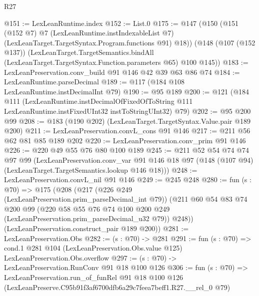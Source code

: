 \begin{lexlean}{R27}
\begin{coremodule}
@151 := LexLeanRuntime.index
@152 := List.{0}
@175 := @147
    (@150
      (@151
        (@152 @7)
        @7
        (LexLeanRuntime.instIndexableList @7)
        (LexLeanTarget.TargetSyntax.Program.functions @91)
        @18))
    (@148
      (@107 (@152 @137))
      (LexLeanTarget.TargetSemantics.bindAll
        (LexLeanTarget.TargetSyntax.Function.parameters @65)
        @100
        @145))
@183 := LexLeanPreservation.conv_build @91 @146 @42 @39 @63 @86 @74
@184 := LexLeanRuntime.parseDecimal
@189 := @117 (@184 @108 LexLeanRuntime.instDecimalInt @79)
@190 := @95 @189
@200 := @121
    (@184
      @111
      (LexLeanRuntime.instDecimalOfFixedOfToString
        @111
        LexLeanRuntime.instFixedUInt32
        instToStringUInt32)
      @79)
@202 := @95 @200 @99
@208 := @183 (@190 @202) (LexLeanTarget.TargetSyntax.Value.pair @189 @200)
@211 := LexLeanPreservation.convL_cons @91 @146
@217 := @211 @56 @62 @81 @85 @189 @202
@220 := LexLeanPreservation.conv_prim @91 @146
@226 := @220 @49 @55 @76 @80 @100 @189
@245 := @211
    @52
    @54
    @74
    @74
    @97
    @99
    (LexLeanPreservation.conv_var
      @91
      @146
      @18
      @97
      (@148 (@107 @94) (LexLeanTarget.TargetSemantics.lookup @146 @18)))
@248 := LexLeanPreservation.convL_nil @91 @146
@249 := @245 @248
@280 := fun (s : @70) =>
  @175
    (@208
      (@217
        (@226 @249 (LexLeanPreservation.prim_parseDecimal_int @79))
        (@211
          @60
          @54
          @83
          @74
          @200
          @99
          (@220 @58 @55 @76 @74 @100 @200 @249 (LexLeanPreservation.prim_parseDecimal_u32 @79))
          @248))
      (LexLeanPreservation.construct_pair @189 @200))
@281 := LexLeanPreservation.Obs
@282 := (s : @70) -> @281
@291 := fun (s : @70) =>
  cond.{1} @281 @104 (LexLeanPreservation.Obs.value @125) LexLeanPreservation.Obs.overflow
@297 := (s : @70) -> LexLeanPreservation.RunConv @91 @18 @100 @126
@306 := fun (s : @70) =>
  LexLeanPreservation.run_of_funRel
    @91
    @18
    @100
    @126
    (LexLeanPreserve.C95b91f3af6700dfb6a29c7feea7beff1.R27.__rel_0 @79)
\end{coremodule}
\end{lexlean}

